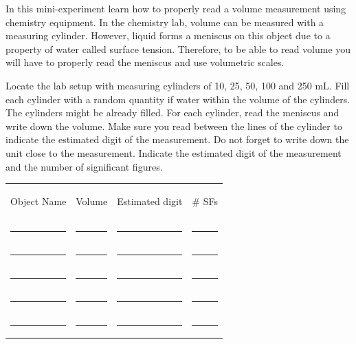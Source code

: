 \documentclass[main.tex]{subfiles}
\begin{document}
\vspace{0.2cm}{\large \bfseries 3. Measuring volume}
In this mini-experiment learn how to properly read a volume measurement using chemistry equipment. In the chemistry lab, volume can be measured with a measuring cylinder. However, liquid forms a meniscus on this object due to a property of water called surface tension. Therefore, to be able to read volume you will have to properly read the meniscus and use volumetric scales.
\begin{steps}
    \newstep[] Locate the lab setup with measuring cylinders of 10, 25, 50, 100 and 250 mL.
        \newstep[]  Fill each cylinder with a random quantity if water within the volume of the cylinders. The cylinders might be already filled.
        \newstep[]  For each cylinder, read the meniscus and write down the volume. Make sure you read between the lines of the cylinder to indicate the estimated digit of the measurement. Do not forget to write down the unit close to the measurement.
         \newstep[] Indicate the estimated digit of the measurement and the number of significant figures.     
\end{steps}

\begin{center} \begin{tabular}{ p{5cm} p{3cm} p{3cm}p{3cm}   }
   \begin{bf}Object Name\end{bf} & \begin{bf}Volume\end{bf} &\begin{bf}Estimated digit\end{bf} &\begin{bf}\# SFs\end{bf} \\[0.1cm]     
  \rule{5cm}{0.4pt} 				&\rule{3cm}{0.4pt}&\rule{3cm}{0.4pt}&\rule{1cm}{0.4pt}  \\[0.3cm]      
  \rule{5cm}{0.4pt} 				&\rule{3cm}{0.4pt}&\rule{3cm}{0.4pt}&\rule{1cm}{0.4pt}  \\[0.3cm]      
  \rule{5cm}{0.4pt} 				&\rule{3cm}{0.4pt}&\rule{3cm}{0.4pt}&\rule{1cm}{0.4pt}  \\[0.3cm]      
  \rule{5cm}{0.4pt} 				&\rule{3cm}{0.4pt}&\rule{3cm}{0.4pt}&\rule{1cm}{0.4pt}  \\[0.3cm]      
  \rule{5cm}{0.4pt} 				&\rule{3cm}{0.4pt}&\rule{3cm}{0.4pt}&\rule{1cm}{0.4pt}  \\[0.3cm]      
 \end{tabular}\end{center}
\end{document}
